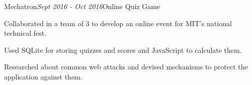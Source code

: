 \begin{rSubsection}{Mechatron}{\em Sept 2016 - Oct 2016}{Online Quiz Game}{}
    \item Collaborated in a team of 3 to develop an online event for MIT's national technical fest.
    \item Used SQLite for storing quizzes and scores and JavaScript to calculate them.
    \item Researched about common web attacks and devised mechanisms to protect the application against them.
\end{rSubsection}
